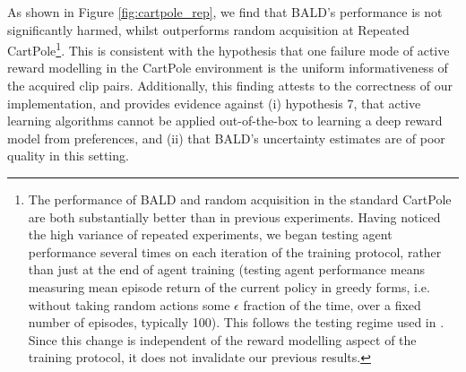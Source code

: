 \documentclass[11pt, a4paper, bibliography=totoc]{report}
\begin{document}
As shown in Figure \ref{fig:cartpole_rep}, we find that BALD's performance is not significantly harmed, whilst outperforms random acquisition at Repeated CartPole\footnote{The performance of BALD and random acquisition in the standard CartPole are both substantially better than in previous experiments. Having noticed the high variance of repeated experiments, we began testing agent performance several times on each iteration of the training protocol, rather than just at the end of agent training (testing agent performance means measuring mean episode return of the current policy in greedy forms, i.e. without taking random actions some $ \epsilon $ fraction of the time, over a fixed number of episodes, typically 100). This follows the testing regime used in \cite{Mnih2015}. Since this change is independent of the reward modelling aspect of the training protocol, it does not invalidate our previous results.}. This is consistent with the hypothesis that one failure mode of active reward modelling in the CartPole environment is the uniform informativeness of the acquired clip pairs. Additionally, this finding attests to the correctness of our implementation, and provides evidence against (i) hypothesis 7, that active learning algorithms cannot be applied out-of-the-box to learning a deep reward model from preferences, and (ii) that BALD's uncertainty estimates are of poor quality in this setting. %
\end{document}
